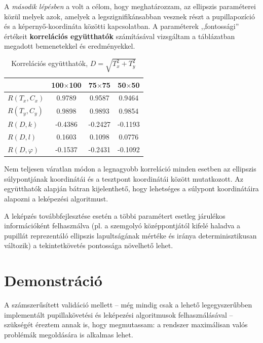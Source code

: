 A \emph{második lépésben} a volt a célom, hogy meghatározzam, az ellipszis paraméterei közül melyek azok, amelyek a legszignifikánsabban vesznek részt a pupillapozíció és a képernyő-koordináta közötti kapcsolatban. A paraméterek ,,fontossági'' értékeit \textbf{korrelációs együtthatók} számításával vizsgáltam a  táblázatban megadott bemenetekkel és eredményekkel. 

\begin{table}[ht]
	\centering
	\caption{Korrelációs együtthatók, $D = \sqrt{T_x^2+T_y^2}$} \label{tab:korrel}
	\begin{tabularx}{0.6\textwidth}{ l | S | S | S }
	 & \textbf{100$\times$100} & \textbf{75$\times$75} & \textbf{50$\times$50} \\ \hline \hline
	$R(T_x, C_x)$    & 0.9789    & 0.9587   & 0.9464 \\
	$R(T_y, C_y)$    & 0.9898    & 0.9893   & 0.9854 \\
	$R(D, k)$        & -0.4386   & -0.2427  & -0.1193 \\
	$R(D, l)$        & 0.1603    & 0.1098   & 0.0776 \\
	$R(D, \varphi)$  & -0.1537   & -0.2431  &  -0.1092 \\
	\end{tabularx}
\end{table}

Nem teljesen váratlan módon a legnagyobb korreláció minden esetben az ellipszis súlypontjának koordinátái és a tesztpont koordinátái között mutatkozott. Az együtthatók alapján bátran kijelenthető, hogy lehetséges a súlypont koordinátáira alapozni a leképezési algoritmust.

A leképzés továbbfejlesztése esetén a többi paramétert esetleg járulékos információként felhasználva (pl. a szemgolyó középpontjától kifelé haladva a pupillát reprezentáló ellipszis lapultságának mértéke és iránya determinisztikusan változik) a tekintetkövetés pontossága növelhető lehet.

\section{Demonstráció}\label{sect:demonstracio}

A számszerűsített validáció mellett -- még mindig csak a lehető legegyszerűbben implementált pupillakövetési és leképezési algoritmusok felhasználásával -- szükségét éreztem annak is, hogy megmutassam: a rendszer maximálisan valós problémák megoldására is alkalmas lehet.

